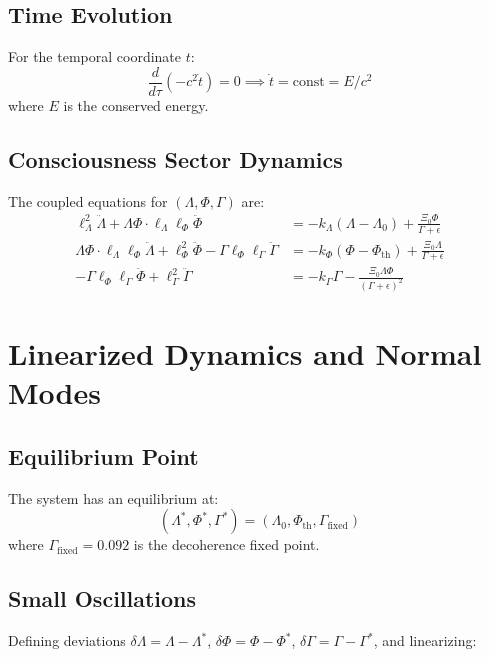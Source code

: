\documentclass[12pt,letterpaper]{article}
\begin{document}
\subsection{Time Evolution}
For the temporal coordinate $t$:
\begin{equation}
\frac{d}{d\tau}(-c^2 \dot{t}) = 0 \implies \dot{t} = \text{const} = E/c^2
\end{equation}
where $E$ is the conserved energy.

\subsection{Consciousness Sector Dynamics}
The coupled equations for $(\Lambda, \Phi, \Gamma)$ are:
\begin{align}
\ell_\Lambda^2 \ddot{\Lambda} + \Lambda\Phi \cdot \ell_\Lambda \ell_\Phi \ddot{\Phi} &= -k_\Lambda(\Lambda - \Lambda_0) + \frac{\Xi_0 \Phi}{\Gamma + \epsilon} \label{eq:eom-lambda} \\
\Lambda\Phi \cdot \ell_\Lambda \ell_\Phi \ddot{\Lambda} + \ell_\Phi^2 \ddot{\Phi} - \Gamma \ell_\Phi \ell_\Gamma \ddot{\Gamma} &= -k_\Phi(\Phi - \Phi_{\text{th}}) + \frac{\Xi_0 \Lambda}{\Gamma + \epsilon} \label{eq:eom-phi} \\
-\Gamma \ell_\Phi \ell_\Gamma \ddot{\Phi} + \ell_\Gamma^2 \ddot{\Gamma} &= -k_\Gamma \Gamma - \frac{\Xi_0 \Lambda \Phi}{(\Gamma + \epsilon)^2} \label{eq:eom-gamma}
\end{align}

\section{Linearized Dynamics and Normal Modes}

\subsection{Equilibrium Point}
The system has an equilibrium at:
\begin{equation}
(\Lambda^*, \Phi^*, \Gamma^*) = (\Lambda_0, \Phi_{\text{th}}, \Gamma_{\text{fixed}})
\end{equation}
where $\Gamma_{\text{fixed}} = 0.092$ is the decoherence fixed point.

\subsection{Small Oscillations}
Defining deviations $\delta\Lambda = \Lambda - \Lambda^*$, $\delta\Phi = \Phi - \Phi^*$, $\delta\Gamma = \Gamma - \Gamma^*$, and linearizing:
\end{document}
